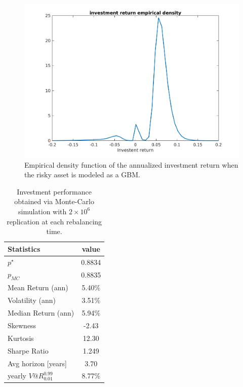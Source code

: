 \begin{figure}[]
	\includegraphics[scale = 0.4]{Images/Densityext1}
	\caption{Empirical density function of the annualized investment return when the risky asset is modeled as a \gls{GBM}.}
	\label{fig:ext1_investment_return}
\end{figure}
\begin{table}[]
	\centering
		\begin{tabular}{@{}lc@{}}
			\toprule
			Statistics & value  \\
			\midrule
			$p^{\star}$ & 0.8834\\
			\addlinespace[0.5em]	
			$p_{MC}$ & 0.8835\\
			\addlinespace[0.5em]
			Mean Return (ann) & 5.40\%\\
			\addlinespace[0.5em]
			Volatility (ann) & 3.51\%\\
			\addlinespace[0.5em]
			Median Return (ann) & 5.94\%\\
			\addlinespace[0.5em]
			Skewness & -2.43\\
			\addlinespace[0.5em]
			Kurtosis & 12.30\\
			\addlinespace[0.5em]
			Sharpe Ratio & 1.249\\
			\addlinespace[0.5em]
			Avg horizon [years] & 3.70 \\
			\addlinespace[0.5em]
			yearly $V@R^{0.99}_{0.01}$ & 8.77\%\\	
			\bottomrule
		\end{tabular}
		\caption{Investment performance obtained via Monte-Carlo simulation with $2\times10^6$ replication at each rebalancing time.}
		\label{tab:performance_ext1}
\end{table}

